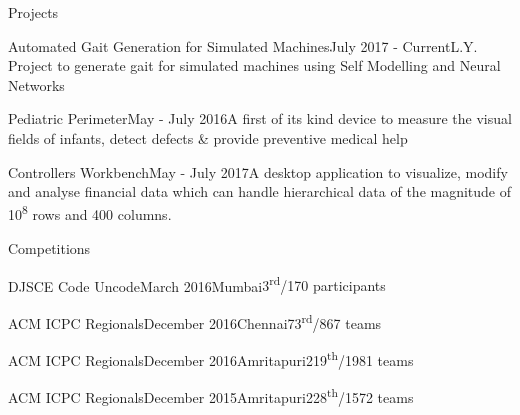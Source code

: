 \documentclass[a4paper]{resume} %
\begin{document}
\begin{rSection}{Projects}
\begin{rProjects}{Automated Gait Generation for Simulated Machines}{July 2017 - Current}{L.Y. Project to generate gait for simulated machines using Self Modelling and Neural Networks}
\end{rProjects}
\begin{rProjects}{Pediatric Perimeter}{May - July 2016}{A first of its kind device to measure the visual fields of infants, detect defects \& provide preventive medical help}
\end{rProjects}
\begin{rProjects}{Controllers Workbench}{May - July 2017}{A desktop application to visualize, modify and analyse financial data which can handle hierarchical data of the magnitude of 10\textsuperscript{8} rows and 400 columns.}
\end{rProjects}
\end{rSection}

\begin{rSection}{Competitions}
\begin{rCompetitions}{DJSCE Code Uncode}{March 2016}{Mumbai}{3\textsuperscript{rd}/170 participants}
\end{rCompetitions}
\begin{rCompetitions}{ACM ICPC Regionals}{December 2016}{Chennai}{73\textsuperscript{rd}/867 teams}
\end{rCompetitions}
\begin{rCompetitions}{ACM ICPC Regionals}{December 2016}{Amritapuri}{219\textsuperscript{th}/1981 teams}
\end{rCompetitions}
\begin{rCompetitions}{ACM ICPC Regionals}{December 2015}{Amritapuri}{228\textsuperscript{th}/1572 teams}
\end{rCompetitions}
\end{rSection}
\end{document}
